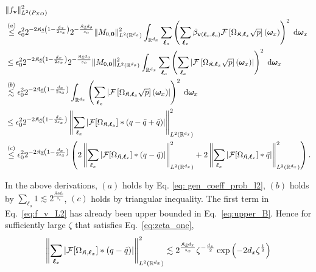 \documentclass[11pt]{article}
\newcommand{\bv}{\mathbf v}
\newcommand{\bomega}{\boldsymbol{\omega}}
\newcommand{\calF}{\mathcal{F}}
\newcommand{\bl}{{\boldsymbol\ell}}
\newcommand{\0}{\mathbf{0}}
\begin{document}
\begin{appendix}
\begin{small}
\begin{align}\label{eq:f_v_L2}
    &\|f_{\bv}\|^2_{L^2(P_{XO})} \nonumber \\ &\stackrel{(a)}{\leq} \epsilon_0^2 2^{-2\mathfrak{K}\underline{s}\left(1 - \frac{d_x}{2s_x}\right)} 2^{-\frac{\mathfrak{K}\underline{s}d_o}{s_o}}\|M_{0,\boldsymbol{0}}\|^2_{L^2(\mathbb{R}^{d_o})}\int_{\mathbb{R}^{d_x}} \sum_{\bl_o}\left(\sum_{\bl_x}\beta_{\bv(\bl_x,\bl_o)}\calF\left[\Omega_{\mathfrak{K},\bl_x}\sqrt{p}\right](\bomega_x)\right)^2\;\mathrm{d}\bomega_x \nonumber \\
    &\leq \epsilon_0^2 2^{-2\mathfrak{K}\underline{s}\left(1 - \frac{d_x}{2s_x}\right)} 2^{-\frac{\mathfrak{K}\underline{s}d_o}{s_o}}\|M_{0,\boldsymbol{0}}\|^2_{L^2(\mathbb{R}^{d_o})}\int_{\mathbb{R}^{d_x}} \sum_{\bl_o}\left(\sum_{\bl_x} \left| \calF\left[\Omega_{\mathfrak{K},\bl_x}\sqrt{p}\right](\bomega_x) \right| \right)^2\;\mathrm{d}\bomega_x \nonumber \\
    &\stackrel{(b)}{\lesssim} \epsilon_0^2 2^{-2\mathfrak{K}\underline{s}\left(1 - \frac{d_x}{2s_x}\right)} \int_{\mathbb{R}^{d_x}} \left(\sum_{\bl_x} \left| \calF\left[\Omega_{\mathfrak{K},\bl_x}\sqrt{p}\right](\bomega_x) \right| \right)^2\;\mathrm{d}\bomega_x \nonumber \\
    &\leq \epsilon_0^2 2^{-2\mathfrak{K}\underline{s}\left(1 - \frac{d_x}{2s_x}\right)}  \left\|\sum_{\bl_x} \left| \calF[\Omega_{\mathfrak{K},\bl_x}] \ast (q - \Tilde{q} + \Tilde{q}) \right| \right\|^2_{L^2(\mathbb{R}^{d_x})} \nonumber \\
    &\stackrel{(c)}{\leq} \epsilon_0^2 2^{-2\mathfrak{K}\underline{s}\left(1 - \frac{d_x}{2s_x}\right)}  \left(2\left\|\sum_{\bl_x} \left|\calF[\Omega_{\mathfrak{K},\bl_x}]\ast (q-\Tilde{q}) \right| \right\|^2_{L^2(\mathbb{R}^{d_x})} + 2\left\|\sum_{\bl_x} \left| \calF[\Omega_{\mathfrak{K},\bl_x}]\ast \Tilde{q} \right| \right\|^2_{L^2(\mathbb{R}^{d_x})}\right) .
\end{align}
\end{small}
In the above derivations, $(a)$ holds by Eq. \eqref{eq: gen_coeff_prob_l2}, $(b)$ holds by $\sum_{\bl_o}1 \lesssim 2^{\frac{\mathfrak{K}\underline{s}d_o}{s_o}}$, $(c)$ holds by triangular inequality. 
The first term in Eq.~\eqref{eq:f_v_L2} has already been upper bounded in Eq.~\eqref{eq:upper_B}. Hence for sufficiently large $\zeta$ that satisfies Eq.~\eqref{eq:zeta_one}, 
\begin{align*}
    \left\| \sum_{\bl_x} \left| \calF[\Omega_{\mathfrak{K},\bl_x}]\ast (q-\Tilde{q}) \right| \right\|^2_{L^2(\mathbb{R}^{d_x})} &\lesssim 2^{\frac{\mathfrak{K}\underline{s}d_x}{s_x}} \zeta^{-\frac{d_x}{2}} \exp\left(-2 d_x \zeta^{\frac{1}{2}}\right)\\

\end{align*}
\end{appendix}
\end{document}
